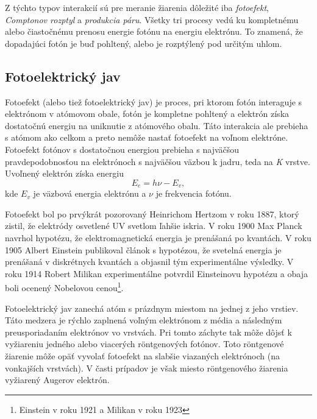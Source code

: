 \documentclass[../../main.tex]{subfiles}
\begin{document}
Z týchto typov interakcií sú pre meranie žiarenia dôležité iba \textit{fotoefekt}, \textit{Comptonov rozptyl} a \textit{produkcia páru}. Všetky tri procesy vedú ku kompletnému alebo čiastočnému prenosu energie fotónu na energiu elektrónu. To znamená, že dopadajúci fotón je buď pohltený, alebo je rozptýlený pod určitým uhlom. 

\subsection{Fotoelektrický jav}

Fotoefekt (alebo tiež fotoelektrický jav) je proces, pri ktorom fotón interaguje s elektrónom v atómovom obale, fotón je kompletne pohltený a elektrón získa dostatočnú energiu na uniknutie z atómového obalu. Táto interakcia ale prebieha s atómom ako celkom a preto nemôže nastať fotoefekt na voľnom elektróne. Fotoefekt fotónov s dostatočnou energiou prebieha s najväčšou pravdepodobnosťou na elektrónoch s najväčšou väzbou k jadru, teda na \textit{K} vrstve. Uvoľnený elektrón získa energiu
\begin{equation}
E_e=h\nu -E_v,
\end{equation}
kde $E_v$ je väzbová energia elektrónu a $\nu$ je frekvencia fotónu.

Fotoefekt bol po prvýkrát pozorovaný Heinrichom Hertzom v roku 1887, ktorý zistil, že elektródy osvetlené UV svetlom ľahšie iskria. V roku 1900 Max Planck navrhol hypotézu, že elektromagnetická energia je prenášaná po kvantách. V roku 1905 Albert Einstein publikoval článok s hypotézou, že svetelná energia je prenášaná v diskrétnych kvantách a objasnil tým experimentálne výsledky. V roku 1914 Robert Milikan experimentálne potvrdil Einsteinovu hypotézu a obaja boli ocenený Nobelovou cenou\footnote{Einstein v roku 1921 a Milikan v roku 1923}.

Fotoelektrický jav zanechá atóm s prázdnym miestom na jednej z jeho vrstiev. Táto medzera je rýchlo zaplnená voľným elektrónom z média a následným preusporiadaním elektrónov vo vrstvách. Pri tomto záchyte tak môže dôjsť k vyžiareniu jedného alebo viacerých r\"{o}ntgenových fotónov. Toto r\"{o}ntgenové žiarenie môže opäť vyvolať fotoefekt na slabšie viazaných elektrónoch (na vonkajších vrstvách). V časti prípadov je však miesto r\"{o}ntgenového žiarenia vyžiarený Augerov elektrón.
\end{document}
